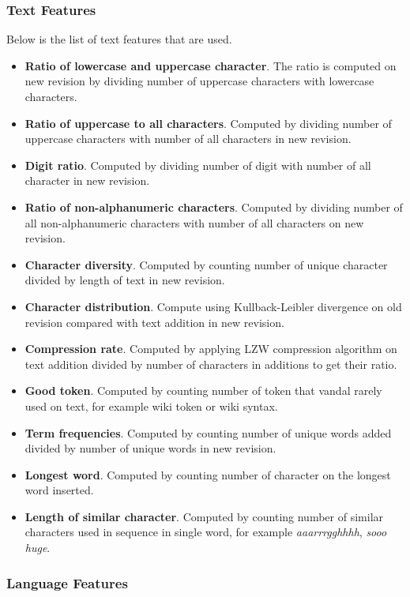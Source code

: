 \documentclass[conference,compsoc,a4paper,twocolumn,final]{IEEEtran}
\begin{document}
\subsubsection{Text Features}

Below is the list of text features that are used.

\begin{itemize}
\item \textbf{Ratio of lowercase and uppercase character}. The ratio is
computed on new revision by dividing number of uppercase characters with
lowercase characters.
\item \textbf{Ratio of uppercase to all characters}. Computed by dividing
number of uppercase characters with number of all characters in new revision.
\item \textbf{Digit ratio}. Computed by dividing number of digit with number of
all character in new revision.
\item \textbf{Ratio of non-alphanumeric characters}. Computed by dividing
number of all non-alphanumeric characters with number of all characters on new
revision.
\item \textbf{Character diversity}. Computed by counting number of unique
character divided by length of text in new revision.
\item \textbf{Character distribution}. Compute using Kullback-Leibler
divergence on old revision compared with text addition in new revision.
\item \textbf{Compression rate}. Computed by applying LZW compression algorithm
on text addition divided by number of characters in additions to get their
ratio.
\item \textbf{Good token}. Computed by counting number of token that vandal
rarely used on text, for example wiki token or wiki syntax.
\item \textbf{Term frequencies}. Computed by counting number of unique words
added divided by number of unique words in new revision.
\item \textbf{Longest word}. Computed by counting number of character on the
longest word inserted.
\item \textbf{Length of similar character}. Computed by counting number of
similar characters used in sequence in single word, for example
\textit{aaarrrgghhhh}, \textit{sooo huge}.
\end{itemize}

\subsubsection{Language Features}
\end{document}
